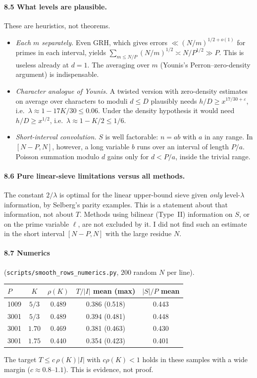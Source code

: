 \documentclass[11pt,a4paper]{article}
\theoremstyle{remark}
\begin{document}
\paragraph{8.5 What levels are plausible.}
These are heuristics, not theorems.
\begin{itemize}
\item \emph{Each $m$ separately.} Even GRH, which gives errors $\ll(N/m)^{1/2+o(1)}$ for primes in each interval,
yields $\sum_{m\le N/P}(N/m)^{1/2}\asymp N/P^{1/2}\gg P$. This is useless already at $d=1$. The averaging over $m$
(Younis's Perron--zero-density argument) is indispensable.
\item \emph{Character analogue of Younis.} A twisted version with zero-density estimates on average over
characters to moduli $d\le D$ plausibly needs $h/D\ge x^{17/30+\varepsilon}$, i.e.\ $\lambda\approx1-17K/30\le0.06$.
Under the density hypothesis it would need $h/D\ge x^{1/2}$, i.e.\ $\lambda\approx1-K/2\le1/6$.
\item \emph{Short-interval convolution.} $S$ is well factorable: $n=ab$ with $a$ in any range. In $[N-P,N]$,
however, a long variable $b$ runs over an interval of length $P/a$. Poisson summation modulo $d$ gains only
for $d<P/a$, inside the trivial range.
\end{itemize}

\paragraph{8.6 Pure linear-sieve limitations versus all methods.}
The constant $2/\lambda$ is optimal for the linear upper-bound sieve given \emph{only} level-$\lambda$ information,
by Selberg's parity examples. This is a statement about that information, not about $T$. Methods using
bilinear (Type~II) information on $S$, or on the prime variable $\ell$, are not excluded by it. I did not find
such an estimate in the short interval $[N-P,N]$ with the large residue $N$.

\paragraph{8.7 Numerics} (\texttt{scripts/smooth\_rows\_numerics.py}, $200$ random $N$ per line).
\begin{center}
\begin{tabular}{@{}lcccc@{}}
\toprule
$P$ & $K$ & $\rho(K)$ & $T/|I|$ mean (max) & $|S|/P$ mean\\
\midrule
1009 & $5/3$ & 0.489 & 0.386 (0.518) & 0.443\\
3001 & $5/3$ & 0.489 & 0.394 (0.481) & 0.448\\
3001 & $1.70$ & 0.469 & 0.381 (0.463) & 0.430\\
3001 & $1.75$ & 0.440 & 0.354 (0.423) & 0.401\\
\bottomrule
\end{tabular}
\end{center}
The target $T\le c\,\rho(K)|I|$ with $c\rho(K)<1$ holds in these samples with a wide margin ($c\approx0.8$--$1.1$).
This is evidence, not proof.
\end{document}
